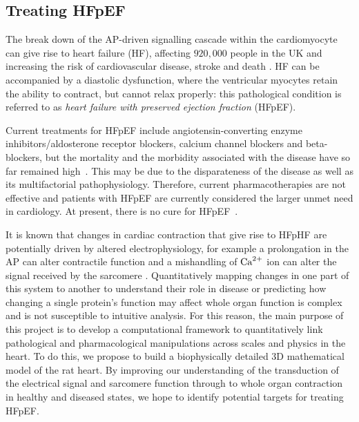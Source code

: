 %
%
%
\subsection{Treating HFpEF}
The break down of the AP-driven signalling cascade within the cardiomyocyte can give rise to heart failure (\acs{HF}), affecting $920,000$ people in the UK \cite{Bhf:2021} and increasing the risk of cardiovascular disease, stroke and death \cite{Adelborg:2017, Henkel:2008}. HF can be accompanied by a diastolic dysfunction, where the ventricular myocytes retain the ability to contract, but cannot relax properly: this pathological condition is referred to as \textit{heart failure with preserved ejection fraction} (\acs{HFpEF}).

\vspace{0.2cm}
Current treatments for HFpEF include angiotensin-converting enzyme inhibitors/aldosterone receptor blockers, calcium channel
blockers and beta-blockers, but the mortality and the morbidity associated with the
disease have so far remained high~\cite{Adamczak:2020}. This may be due to the disparateness of the disease as well as its multifactorial pathophysiology. Therefore, current pharmacotherapies are not effective and patients with HFpEF are
currently considered the larger unmet need in cardiology. At present, there is no cure for HFpEF~\cite{Owan:2006}.

\vspace{0.2cm}
It is known that changes in cardiac contraction that give rise to HFpHF are potentially driven by altered electrophysiology, for example a prolongation in the AP can alter contractile function and a mishandling of $\textrm{Ca}^{2+}$ ion can alter the signal received by the sarcomere \cite{Asp:2013, Gorski:2015}. Quantitatively mapping changes in one part of this system to another to understand their role in disease or predicting how changing a single protein's function may affect whole organ function is complex and is not susceptible to intuitive analysis. For this reason, the main purpose of this project is to develop a computational framework to quantitatively link pathological and pharmacological manipulations across scales and physics in the heart. To do this, we propose to build a biophysically detailed $3$D mathematical model of the rat heart. By improving our understanding of the transduction of the electrical signal and sarcomere function through to whole organ contraction in healthy and diseased states, we hope to identify potential targets for treating HFpEF.












